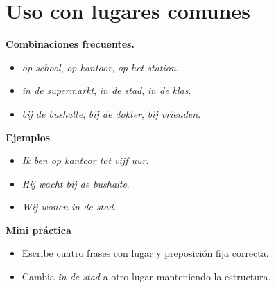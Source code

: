 \section{Uso con lugares comunes}
\textbf{Combinaciones frecuentes.}
\begin{itemize}[leftmargin=*]
  \item \textit{op school}, \textit{op kantoor}, \textit{op het station}.
  \item \textit{in de supermarkt}, \textit{in de stad}, \textit{in de klas}.
  \item \textit{bij de bushalte}, \textit{bij de dokter}, \textit{bij vrienden}.
\end{itemize}

\textbf{Ejemplos}
\begin{itemize}[leftmargin=*]
  \item \textit{Ik ben op kantoor tot vijf uur}.
  \item \textit{Hij wacht bij de bushalte}.
  \item \textit{Wij wonen in de stad}.
\end{itemize}

\textbf{Mini práctica}
\begin{itemize}[leftmargin=*]
  \item Escribe cuatro frases con lugar y preposición fija correcta.
  \item Cambia \textit{in de stad} a otro lugar manteniendo la estructura.
\end{itemize}
